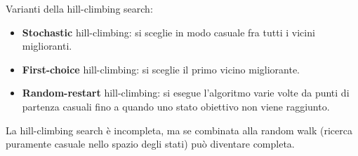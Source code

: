 Varianti della hill-climbing search:

\begin{itemize}
 \item \textbf{Stochastic} hill-climbing: si sceglie in modo casuale fra
tutti i vicini miglioranti.
 \item \textbf{First-choice} hill-climbing: si sceglie il primo vicino
migliorante.
 \item \textbf{Random-restart} hill-climbing: si esegue l'algoritmo varie volte
da punti di partenza casuali fino a quando uno stato obiettivo non viene
raggiunto.
\end{itemize}

La hill-climbing search è incompleta, ma se combinata alla random walk
(ricerca puramente casuale nello spazio degli stati) può diventare completa.
